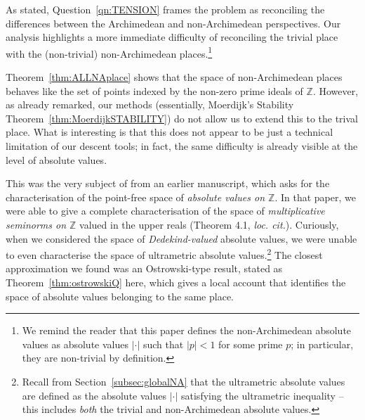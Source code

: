 \documentclass[a4paper, 11pt,reqno]{amsart}
\newcommand{\Z}{\mathbb{Z}}
\begin{document}
\begin{discussion} As stated, Question~\ref{qn:TENSION} frames the problem as reconciling the differences between the Archimedean and non-Archimedean perspectives. Our analysis highlights a more immediate difficulty of reconciling the trivial place with the (non-trivial) non-Archimedean places.\footnote{We remind the reader that this paper defines the non-Archimedean absolute values as absolute values $|\cdot|$ such that $|p|<1$ for some prime $p$; in particular, they are non-trivial by definition.}
	
 Theorem~\ref{thm:ALLNAplace} shows that the space of non-Archimedean places behaves like the set of points indexed by the non-zero prime ideals of $\Z$. However, as already remarked, our methods (essentially, Moerdijk's Stability Theorem~\ref{thm:MoerdijkSTABILITY}) do not allow us to extend this to the trival place. What is interesting is that this does not appear to be just a technical limitation of our descent tools; in fact, the same difficulty is already visible at the level of absolute values.
 
This was the very subject of \cite[Problem 6.1]{NVOstrowski} from an earlier manuscript, which asks for the characterisation of the point-free space of {\em absolute values on $\Z$}. In that paper, we were able to give a complete characterisation of the space of {\em multiplicative seminorms on $\Z$} valued in the upper reals (Theorem 4.1, {\em loc. cit.}). Curiously, when we considered the space of {\em Dedekind-valued} absolute values, we were unable to even characterise the space of ultrametric absolute values.\footnote{Recall from Section~\ref{subsec:globalNA} that the ultrametric absolute values are defined as the absolute values $|\cdot|$ satisfying the ultrametric inequality -- this includes {\em both} the trivial and non-Archimedean absolute values.} The closest approximation we found was an Ostrowski-type result, stated as Theorem~\ref{thm:ostrowskiQ} here, which gives a local
 account that identifies the space of absolute values belonging to the same place.
\end{discussion}
\end{document}
